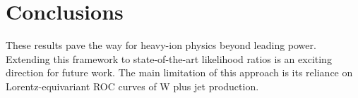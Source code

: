 \section{Conclusions}\label{sec:conclusions}

These results pave the way for heavy-ion physics beyond leading power.
Extending this framework to state-of-the-art likelihood ratios is an
exciting direction for future work. The main limitation of this approach
is its reliance on Lorentz-equivariant ROC curves of W plus jet
production.

